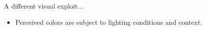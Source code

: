 \documentclass{beamer}
\begin{document}
\begin{frame}
   \begin{figure}[!htbp]
   \begin{center}
   \end{center}
   \end{figure}
\end{frame}

\begin{frame}
   A different visual exploit...
   \begin{itemize}
   \item{Perceived colors are subject to lighting conditions and context.}
   \end{itemize}
\end{frame}

\begin{frame}
   \begin{figure}[!htbp]
   \begin{center}
   \end{center}
   \end{figure}
\end{frame}
\end{document}
